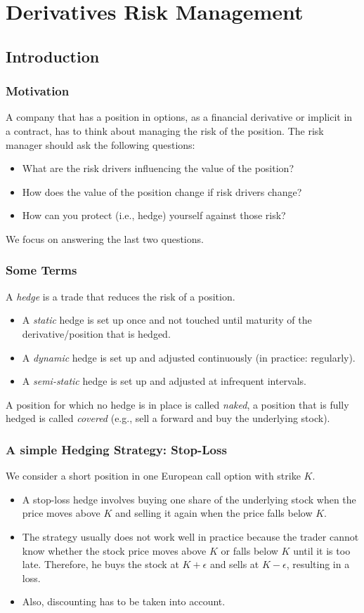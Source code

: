 \section{Derivatives Risk Management}

\subsection{Introduction}
\begin{frame}[fragile]
\frametitle{Motivation}
A company that has a position in options, as a financial derivative or implicit
in a contract, has to think about managing the risk of the position. The risk
manager should ask the following questions:
\begin{itemize}
  \item What are the risk drivers influencing the value of the position?
  \item How does the value of the position change if risk drivers change?
  \item How can you protect (i.e., hedge) yourself against those risk?
\end{itemize}
We focus on answering the last two questions.
\end{frame}

\begin{frame}[fragile]
\frametitle{Some Terms}
A \emph{hedge} is a trade that reduces the risk of a position.
\begin{itemize}
  \item A \emph{static} hedge is set up once and not touched until maturity of
  the derivative/position that is hedged.
  \item A \emph{dynamic} hedge is set up and adjusted continuously (in practice:
  regularly).
  \item A \emph{semi-static} hedge is set up and adjusted at infrequent
  intervals.
\end{itemize}
A position for which no hedge is in place is called \emph{naked}, a position
that is fully hedged is called \emph{covered} (e.g., sell a forward and buy the
underlying stock).
\end{frame}

\begin{frame}[fragile]
\frametitle{A simple Hedging Strategy: Stop-Loss}
We consider a short position in one European call option with strike $K$.
\begin{itemize}
  \item A stop-loss hedge involves buying one share of the underlying stock when
  the price moves above $K$ and selling it again when the price falls below $K$.
  \item The strategy usually does not work well in practice because the trader
  cannot know whether the stock price moves above $K$ or falls below $K$ until
  it is too late. Therefore, he buys the stock at $K+\epsilon$ and sells at
  $K-\epsilon$, resulting in a loss.
  \item Also, discounting has to be taken into account.
\end{itemize}
\end{frame}

